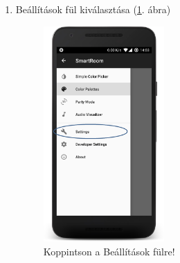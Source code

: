 \documentclass[../main.tex]{subfiles}
\begin{document}
\begin{enumerate}
                \item Beállítások fül kiválasztása (\ref{fig:tap_settigs}. ábra)
                    \begin{figure}[!h]
                        \includegraphics[width=4.6cm]{android_res/screen_pictures/tap_settings_menu}
                        \caption{Koppintson a Beállítások fülre!}
                        \label{fig:tap_settigs}
                    \end{figure}
                    

\end{enumerate}
\end{document}

